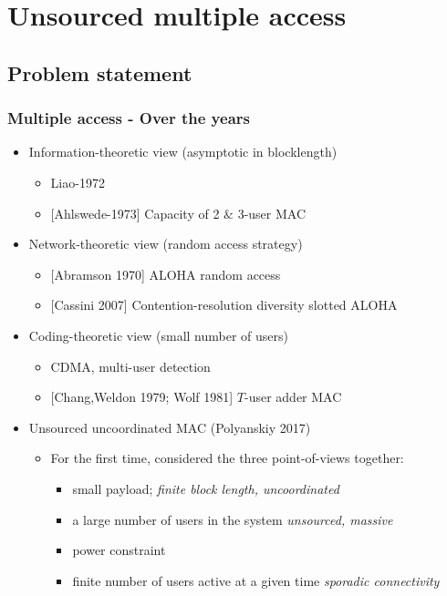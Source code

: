 \section{Unsourced multiple access}
\subsection{Problem statement}
\begin{frame} \frametitle{Multiple access - Over the years}

\begin{itemize}
\setlength{\itemsep}{3ex}
   \item Information-theoretic view (asymptotic in blocklength)
\begin{itemize}
\item  Liao-1972
\item {[Ahlswede-1973]} Capacity of 2 $\&$ 3-user MAC 
\end{itemize}

   \item Network-theoretic view (random access strategy)
	\begin{itemize}
		\item {[Abramson 1970]} ALOHA random access
		\item {[Cassini 2007]} Contention-resolution diversity slotted ALOHA
	\end{itemize}
	
	\item Coding-theoretic view (small number of users)
		\begin{itemize}
		\item  CDMA, multi-user detection
		\item {[Chang,Weldon 1979; Wolf 1981]} $T$-user adder MAC 
	\end{itemize}
	\pause

	\item Unsourced uncoordinated MAC (Polyanskiy 2017)
		\begin{itemize}
			\item For the first time, considered the three point-of-views together: 
			\begin{itemize}
				\item small payload; \emph{finite block length, uncoordinated}
				\item a large number of users in the system \emph{unsourced, massive}
				\item power constraint 
				\item finite number of users active at a given time \emph{sporadic connectivity}
			\end{itemize}
	   \end{itemize}
\end{itemize}
\end{frame}

